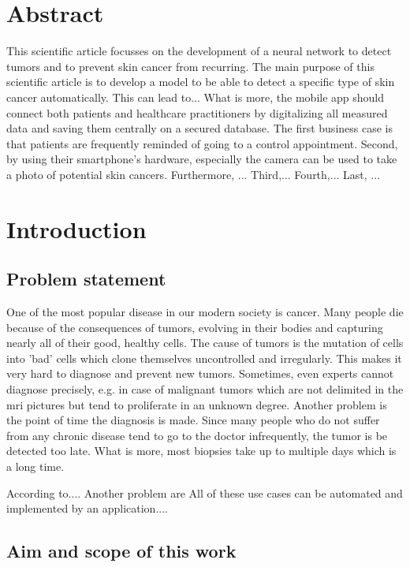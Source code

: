 



\chapter{Abstract}\label{abstract}

This scientific article focusses on the development of a neural network to detect tumors and to prevent skin cancer from recurring.
The main purpose of this scientific article is to develop a model to be able to detect a specific type of skin cancer automatically.
This can lead to...
What is more, the mobile app should connect both patients and healthcare practitioners by digitalizing all measured data and saving them centrally on a secured database. 
The first business case is that patients are frequently reminded of going to a control appointment. 
Second, by using their smartphone's hardware, especially the camera can be used to take a photo of potential skin cancers. 
Furthermore, ...
Third,...
Fourth,...
Last, ...

\chapter{Introduction}\label{introduction}

\section{Problem statement}

One of the most popular disease in our modern society is cancer. Many people die because of the consequences of tumors, evolving in their bodies and capturing nearly all of their good, healthy cells. The cause of tumors is the mutation of cells into 'bad' cells which clone themselves uncontrolled and irregularly. This makes it very hard to diagnose and prevent new tumors. Sometimes, even experts cannot diagnose precisely, e.g. in case of malignant tumors which are not delimited in the \ac{mri} pictures but tend to proliferate in an unknown degree. Another problem is the point of time the diagnosis is made. Since many people who do not suffer from any chronic disease tend to go to the doctor infrequently, the tumor is be detected too late. What is more, most biopsies take up to multiple days which is a long time.

According to....
Another problem are 
All of these use cases can be automated and implemented by an application....

\section{Aim and scope of this work}


